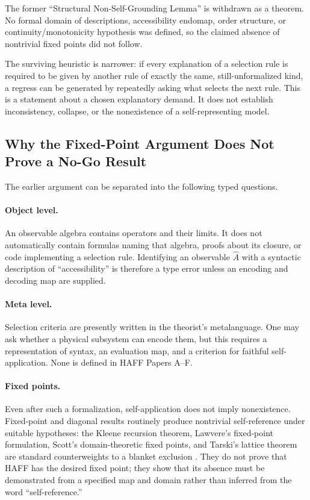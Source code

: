 \documentclass[12pt,a4paper,openany]{book}
\begin{document}
The former ``Structural Non-Self-Grounding Lemma'' is withdrawn as a theorem.  No formal domain of descriptions, accessibility endomap, order structure, or continuity/monotonicity hypothesis was defined, so the claimed absence of nontrivial fixed points did not follow.

The surviving heuristic is narrower: if every explanation of a selection rule is required to be given by another rule of exactly the same, still-unformalized kind, a regress can be generated by repeatedly asking what selects the next rule.  This is a statement about a chosen explanatory demand.  It does not establish inconsistency, collapse, or the nonexistence of a self-representing model.

\subsection{Why the Fixed-Point Argument Does Not Prove a No-Go Result}

The earlier argument can be separated into the following typed questions.

\paragraph{Object level.}
An observable algebra contains operators and their limits.  It does not automatically contain formulas naming that algebra, proofs about its closure, or code implementing a selection rule.  Identifying an observable $\hat A$ with a syntactic description of ``accessibility'' is therefore a type error unless an encoding and decoding map are supplied.

\paragraph{Meta level.}
Selection criteria are presently written in the theorist's metalanguage.  One may ask whether a physical subsystem can encode them, but this requires a representation of syntax, an evaluation map, and a criterion for faithful self-application.  None is defined in HAFF Papers A--F.

\paragraph{Fixed points.}
Even after such a formalization, self-application does not imply nonexistence.  Fixed-point and diagonal results routinely produce nontrivial self-reference under suitable hypotheses: the Kleene recursion theorem, Lawvere's fixed-point formulation, Scott's domain-theoretic fixed points, and Tarski's lattice theorem are standard counterweights to a blanket exclusion \cite{Kleene1952,Lawvere1969,Scott1972,Tarski1955}.  They do not prove that HAFF has the desired fixed point; they show that its absence must be demonstrated from a specified map and domain rather than inferred from the word ``self-reference.''
\end{document}
